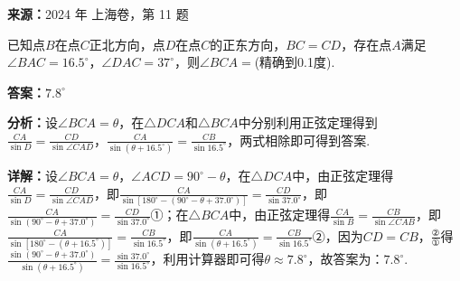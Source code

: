 \begin{question}[points=5]
\textbf{来源：}2024 年 上海卷，第 11 题\par
已知点$B$在点$C$正北方向，点$D$在点$C$的正东方向，$BC=CD$，存在点$A$满足$\angle BAC=16.5^\circ$，$\angle DAC=37^\circ$，则$\angle BCA=$(精确到0.1度).
\fillin[{$7.8^\circ$}]
\begin{solution}
\textbf{答案：}$7.8^\circ$

\textbf{分析：}设$\angle BCA=\theta$，在$\triangle DCA$和$\triangle BCA$中分别利用正弦定理得到$\frac{CA}{\sin D}=\frac{CD}{\sin\angle CAD}$，$\frac{CA}{\sin(\theta+16.5^\circ)}=\frac{CB}{\sin16.5^\circ}$，两式相除即可得到答案.

\textbf{详解：}设$\angle BCA=\theta$，$\angle ACD=90^\circ-\theta$，在$\triangle DCA$中，由正弦定理得$\frac{CA}{\sin D}=\frac{CD}{\sin\angle CAD}$，即$\frac{CA}{\sin[180^\circ-(90^\circ-\theta+37.0^\circ)]}=\frac{CD}{\sin37.0^\circ}$，即$\frac{CA}{\sin(90^\circ-\theta+37.0^\circ)}=\frac{CD}{\sin37.0^\circ}$①；在$\triangle BCA$中，由正弦定理得$\frac{CA}{\sin B}=\frac{CB}{\sin\angle CAB}$，即$\frac{CA}{\sin[180^\circ-(\theta+16.5^\circ)]}=\frac{CB}{\sin16.5^\circ}$，即$\frac{CA}{\sin(\theta+16.5^\circ)}=\frac{CB}{\sin16.5^\circ}$②，因为$CD=CB$，$\frac{②}{①}$得$\frac{\sin(90^\circ-\theta+37.0^\circ)}{\sin(\theta+16.5^\circ)}=\frac{\sin37.0^\circ}{\sin16.5^\circ}$，利用计算器即可得$\theta\approx7.8^\circ$，故答案为：$7.8^\circ$.
\end{solution}
\end{question}

